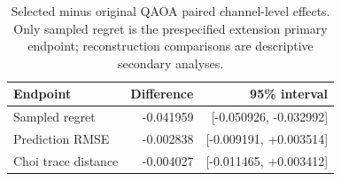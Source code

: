 \begin{table}[htbp]
\centering
\begin{tabular}{lrr}
\toprule
Endpoint & Difference & 95\% interval \\
\midrule
Sampled regret & -0.041959 & [-0.050926, -0.032992] \\
Prediction RMSE & -0.002838 & [-0.009191, +0.003514] \\
Choi trace distance & -0.004027 & [-0.011465, +0.003412] \\
\bottomrule
\end{tabular}
\caption{Selected minus original QAOA paired channel-level effects. Only sampled regret is the prespecified extension primary endpoint; reconstruction comparisons are descriptive secondary analyses.}
\label{tab:paired-effects}
\end{table}
